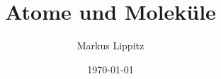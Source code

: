 \documentclass[notoc,nofonts,a4paper,twoside,nobib]{tufte-book}
\newcommand{\kapitelname}{Kapitel\ }
\begin{document}
 
  \tikzexternaldisable 


\title{Atome und Moleküle}

\author{Markus Lippitz}
\date{\today}


\maketitle


\newpage
\thispagestyle{empty}




\tableofcontents

%








 











\renewcommand{\kapitelname}{Anhang\ }

\appendix
\appendixpage


\
%
 
\printbibliography
\end{document}
